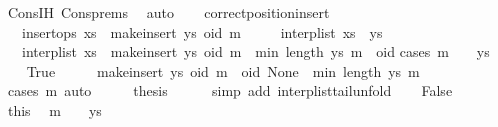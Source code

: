 \begin{isabellebody}
\ Cons{\isachardot}IH\ Cons{\isachardot}prems\ \isamarkupfalse%
\ auto\isanewline
\ \ \isamarkupfalse%
\isanewline
{}\isamarkupfalse%
%
\endisatagproof
{\isafoldproof}%
%
\isadelimproof
\isanewline
%
\endisadelimproof
\isanewline
{}\isamarkupfalse%
\ correct{\isacharunderscore}position{\isacharunderscore}insert{\isacharcolon}\isanewline
\ \ \ {\isachardoublequoteopen}insert{\isacharunderscore}ops\ {\isacharparenleft}xs\ {\isacharat}\ {\isacharbrackleft}make{\isacharunderscore}insert\ ys\ oid\ m{\isacharbrackright}{\isacharparenright}{\isachardoublequoteclose}\isanewline
\ \ \ \ \ {\isachardoublequoteopen}interp{\isacharunderscore}list\ xs\ {\isacharequal}\ ys{\isachardoublequoteclose}\isanewline
\ \ \ {\isachardoublequoteopen}interp{\isacharunderscore}list\ {\isacharparenleft}xs\ {\isacharat}\ {\isacharbrackleft}make{\isacharunderscore}insert\ ys\ oid\ m{\isacharbrackright}{\isacharparenright}\ {\isacharbang}\ min\ {\isacharparenleft}length\ ys{\isacharparenright}\ m\ {\isacharequal}\ oid{\isachardoublequoteclose}\isanewline
%
\isadelimproof
%
\endisadelimproof
%
\isatagproof
{}\isamarkupfalse%
{\isacharparenleft}cases\ {\isachardoublequoteopen}m\ {\isacharequal}\ {}\ {\isasymor}\ ys\ {\isacharequal}\ {\isacharbrackleft}{\isacharbrackright}{\isachardoublequoteclose}{\isacharparenright}\isanewline
\ \ \isamarkupfalse%
\ True\isanewline
\ \ \isamarkupfalse%
\ \isamarkupfalse%
\ {\isachardoublequoteopen}make{\isacharunderscore}insert\ ys\ oid\ m\ {\isacharequal}\ {\isacharparenleft}oid{\isacharcomma}\ None{\isacharparenright}{\isachardoublequoteclose}\ \ {\isachardoublequoteopen}min\ {\isacharparenleft}length\ ys{\isacharparenright}\ m\ {\isacharequal}\ {}{\isachardoublequoteclose}\isanewline
\ \ \ \ \isamarkupfalse%
\ {\isacharparenleft}cases\ m{\isacharcomma}\ auto{\isacharparenright}\isanewline
\ \ \isamarkupfalse%
\ \isamarkupfalse%
\ {\isacharquery}thesis\isanewline
\ \ \ \ \isamarkupfalse%
\ {\isacharparenleft}simp\ add{\isacharcolon}\ interp{\isacharunderscore}list{\isacharunderscore}tail{\isacharunderscore}unfold{\isacharparenright}\isanewline
{}\isamarkupfalse%
\isanewline
\ \ \isamarkupfalse%
\ False\isanewline
\ \ \isamarkupfalse%
\ \isamarkupfalse%
\ this\ \isamarkupfalse%
\ {\isachardoublequoteopen}m\ {\isachargreater}\ {}{\isachardoublequoteclose}\ \ {\isachardoublequoteopen}ys\ {\isasymnoteq}\ {\isacharbrackleft}{\isacharbrackright}{\isachardoublequoteclose}\isanewline

\end{isabellebody}
